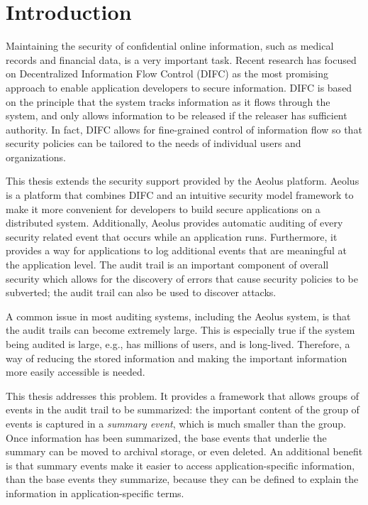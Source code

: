 \chapter{Introduction}

Maintaining the security of confidential online information, such as medical records and financial data, is a very important task. Recent research has focused on Decentralized Information Flow Control (DIFC) as the most promising approach to enable application developers to secure information. DIFC is based on the principle that the system tracks information as it flows through the system, and only allows information to be released if the releaser has sufficient authority. In fact, DIFC allows for fine-grained control of information flow so that security policies can be tailored to the needs of individual users and organizations.

This thesis extends the security support provided by the Aeolus platform. Aeolus is a platform that combines DIFC and an intuitive security model framework to make it more convenient for developers to build secure applications on a distributed system. Additionally, Aeolus provides automatic auditing of every security related event that occurs while an application runs. Furthermore, it provides a way for applications to log additional events that are meaningful at the application level. The audit trail is an important component of overall security which allows for the discovery of errors that cause security policies to be subverted; the audit trail can also be used to discover attacks.

A common issue in most auditing systems, including the Aeolus system, is that the audit trails can become extremely large. This is especially true if the system being audited is large, e.g., has millions of users, and is long-lived. Therefore, a way of reducing the stored information and making the important information more easily accessible is needed.

This thesis addresses this problem. It provides a framework that allows groups of events in the audit trail to be summarized: the important content of the group of events is captured in a \emph{summary event}, which is much smaller than the group. Once information has been summarized, the base events that underlie the summary can be moved to archival storage, or even deleted.  An additional benefit is that summary events make it easier to access application-specific information, than the base events they summarize, because they can be defined to explain the information in application-specific terms.


